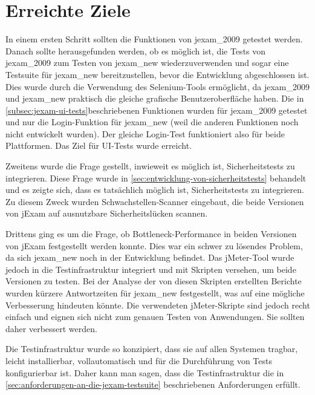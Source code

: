 \section{Erreichte Ziele}

In einem ersten Schritt sollten die Funktionen von \Gls{jexam_2009}
getestet werden. Danach sollte herausgefunden werden, ob es möglich 
ist, die Tests von \Gls{jexam_2009} zum Testen von \Gls{jexam_new} 
wiederzuverwenden und sogar eine Testsuite für \Gls{jexam_new} 
bereitzustellen, bevor die Entwicklung abgeschlossen ist. Dies wurde
durch die Verwendung des Selenium-Tools ermöglicht, da 
\Gls{jexam_2009} und \Gls{jexam_new} praktisch die gleiche grafische 
Benutzeroberfläche haben. Die in \autoref{subsec:jexam-ui-tests}beschriebenen
Funktionen wurden für \Gls{jexam_2009} getestet und nur die Login-Funktion
für \Gls{jexam_new} (weil die anderen Funktionen noch nicht entwickelt
wurden). Der gleiche Login-Test funktioniert also für beide
Plattformen. Das Ziel für UI-Tests wurde erreicht.

Zweitens wurde die Frage gestellt, inwieweit es möglich ist,
Sicherheitstests zu integrieren. Diese Frage wurde in
\autoref{sec:entwicklung-von-sicherheitstests} behandelt und es
zeigte sich, dass es tatsächlich möglich ist,
Sicherheitstests zu integrieren. Zu diesem Zweck wurden
Schwachstellen-Scanner eingebaut, die beide Versionen von jExam
auf ausnutzbare Sicherheitslücken scannen.


Drittens ging es um die Frage, ob Bottleneck-Performance in beiden
Versionen von jExam festgestellt werden konnte. Dies war ein schwer
zu lösendes Problem, da sich \Gls{jexam_new} noch in der Entwicklung
befindet. Das jMeter-Tool wurde jedoch in die Testinfrastruktur
integriert und mit Skripten versehen, um beide Versionen zu testen.
Bei der Analyse der von diesen Skripten erstellten Berichte wurden
kürzere Antwortzeiten für \Gls{jexam_new} festgestellt, was auf eine
mögliche Verbesserung hindeuten könnte. Die verwendeten jMeter-Skripte
sind jedoch recht einfach und eignen sich nicht zum genauen Testen
von Anwendungen. Sie sollten daher verbessert werden.


Die Testinfrastruktur wurde so konzipiert, dass sie auf allen
Systemen tragbar, leicht installierbar, vollautomatisch und für
die Durchführung von Tests konfigurierbar ist. Daher kann man
sagen, dass die Testinfrastruktur die in
\autoref{sec:anforderungen-an-die-jexam-testsuite} beschriebenen
Anforderungen erfüllt.




